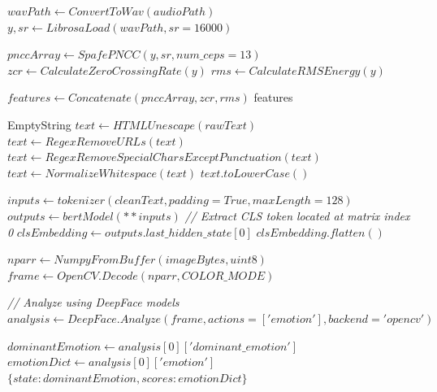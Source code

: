 \documentclass[11pt]{report}
\begin{document}
\begin{algorithm}[H]
\caption{Extract Audio Prosodic Features}
\label{alg:class_audio}
\begin{algorithmic}[1]
    \State $wavPath \gets ConvertToWav(audioPath)$
    \State $y, sr \gets LibrosaLoad(wavPath, sr=16000)$
    
    \State $pnccArray \gets SpafePNCC(y, sr, num\_ceps=13)$
    \State $zcr \gets CalculateZeroCrossingRate(y)$
    \State $rms \gets CalculateRMSEnergy(y)$
    
    \State $features \gets Concatenate(pnccArray, zcr, rms)$
    \State \Return features
\EndProcedure
\end{algorithmic}
\end{algorithm}

\begin{algorithm}[H]
\caption{Clean Text Stream Environment}
\label{alg:class_textclean}
\begin{algorithmic}[1]
     \Return EmptyString \EndIf
    \State $text \gets HTMLUnescape(rawText)$
    \State $text \gets RegexRemoveURLs(text)$
    \State $text \gets RegexRemoveSpecialCharsExceptPunctuation(text)$
    \State $text \gets NormalizeWhitespace(text)$
    \State \Return $text.toLowerCase()$
\EndProcedure
\end{algorithmic}
\end{algorithm}

\begin{algorithm}[H]
\caption{Isolate Transformer Semantic Embeddings}
\label{alg:class_textembed}
\begin{algorithmic}[1]
    \State $inputs \gets tokenizer(cleanText, padding=True, maxLength=128)$
    \State $outputs \gets bertModel(**inputs)$
    \State \textit{// Extract CLS token located at matrix index 0}
    \State $clsEmbedding \gets outputs.last\_hidden\_state[0]$
    \State \Return $clsEmbedding.flatten()$
\EndProcedure
\end{algorithmic}
\end{algorithm}

\begin{algorithm}[H]
\caption{Analyze Facial Bounding Geometry}
\label{alg:class_visual}
\begin{algorithmic}[1]
    \State $nparr \gets NumpyFromBuffer(imageBytes, uint8)$
    \State $frame \gets OpenCV.Decode(nparr, COLOR\_MODE)$
    
    \State \textit{// Analyze using DeepFace models}
    \State $analysis \gets DeepFace.Analyze(frame, actions=['emotion'], backend='opencv')$
    
    \State $dominantEmotion \gets analysis[0]['dominant\_emotion']$
    \State $emotionDict \gets analysis[0]['emotion']$
    \State \Return $\{state: dominantEmotion, scores: emotionDict\}$
\EndProcedure
\end{algorithmic}
\end{algorithm}
\end{document}

